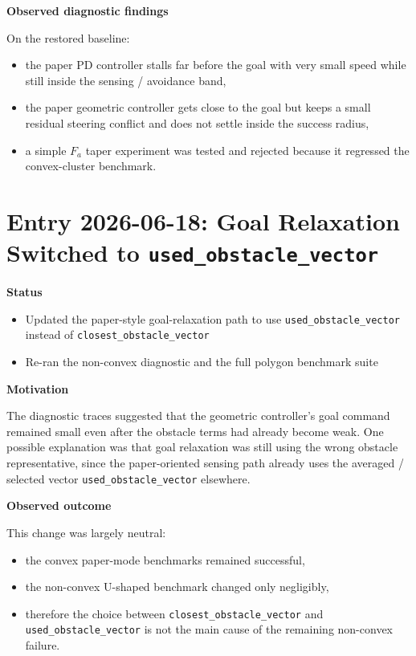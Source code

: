 \documentclass[11pt]{article}
\begin{document}
\textbf{Observed diagnostic findings}

On the restored baseline:

\begin{itemize}[leftmargin=*]
  \item the paper PD controller stalls far before the goal with very small speed while still inside the sensing / avoidance band,
  \item the paper geometric controller gets close to the goal but keeps a small residual steering conflict and does not settle inside the success radius,
  \item a simple \(F_a\) taper experiment was tested and rejected because it regressed the convex-cluster benchmark.
\end{itemize}

\section*{Entry 2026-06-18: Goal Relaxation Switched to \texttt{used\_obstacle\_vector}}

\textbf{Status}

\begin{itemize}[leftmargin=*]
  \item Updated the paper-style goal-relaxation path to use \texttt{used\_obstacle\_vector} instead of \texttt{closest\_obstacle\_vector}
  \item Re-ran the non-convex diagnostic and the full polygon benchmark suite
\end{itemize}

\textbf{Motivation}

The diagnostic traces suggested that the geometric controller's goal command
remained small even after the obstacle terms had already become weak. One
possible explanation was that goal relaxation was still using the wrong
obstacle representative, since the paper-oriented sensing path already uses the
averaged / selected vector \texttt{used\_obstacle\_vector} elsewhere.

\textbf{Observed outcome}

This change was largely neutral:

\begin{itemize}[leftmargin=*]
  \item the convex paper-mode benchmarks remained successful,
  \item the non-convex U-shaped benchmark changed only negligibly,
  \item therefore the choice between \texttt{closest\_obstacle\_vector} and \texttt{used\_obstacle\_vector} is not the main cause of the remaining non-convex failure.
\end{itemize}
\end{document}
